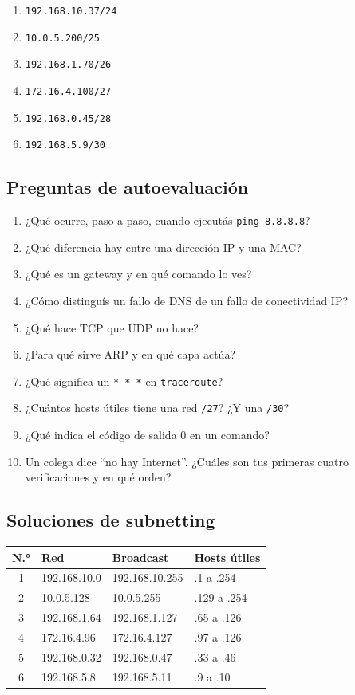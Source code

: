 \documentclass[11pt,a4paper]{article}
\theoremstyle{definition}
\theoremstyle{remark}
\newcommand{\cmd}[1]{\texttt{#1}}
\begin{document}
\begin{enumerate}
  \item \texttt{192.168.10.37/24}
  \item \texttt{10.0.5.200/25}
  \item \texttt{192.168.1.70/26}
  \item \texttt{172.16.4.100/27}
  \item \texttt{192.168.0.45/28}
  \item \texttt{192.168.5.9/30}
\end{enumerate}

\subsection{Preguntas de autoevaluación}

\begin{enumerate}
  \item ¿Qué ocurre, paso a paso, cuando ejecutás \cmd{ping 8.8.8.8}?
  \item ¿Qué diferencia hay entre una dirección IP y una MAC?
  \item ¿Qué es un gateway y en qué comando lo ves?
  \item ¿Cómo distinguís un fallo de DNS de un fallo de conectividad IP?
  \item ¿Qué hace TCP que UDP no hace?
  \item ¿Para qué sirve ARP y en qué capa actúa?
  \item ¿Qué significa un \texttt{* * *} en \cmd{traceroute}?
  \item ¿Cuántos hosts útiles tiene una red \texttt{/27}? ¿Y una \texttt{/30}?
  \item ¿Qué indica el código de salida $0$ en un comando?
  \item Un colega dice ``no hay Internet''. ¿Cuáles son tus primeras cuatro verificaciones y en qué orden?
\end{enumerate}

\subsection{Soluciones de subnetting}

\begin{center}
\begin{tabular}{@{}clll@{}}
\toprule
\textbf{N.°} & \textbf{Red} & \textbf{Broadcast} & \textbf{Hosts útiles}\\
\midrule
1 & 192.168.10.0   & 192.168.10.255 & .1 a .254\\
2 & 10.0.5.128     & 10.0.5.255     & .129 a .254\\
3 & 192.168.1.64   & 192.168.1.127  & .65 a .126\\
4 & 172.16.4.96    & 172.16.4.127   & .97 a .126\\
5 & 192.168.0.32   & 192.168.0.47   & .33 a .46\\
6 & 192.168.5.8    & 192.168.5.11   & .9 a .10\\
\bottomrule
\end{tabular}
\end{center}
\end{document}
